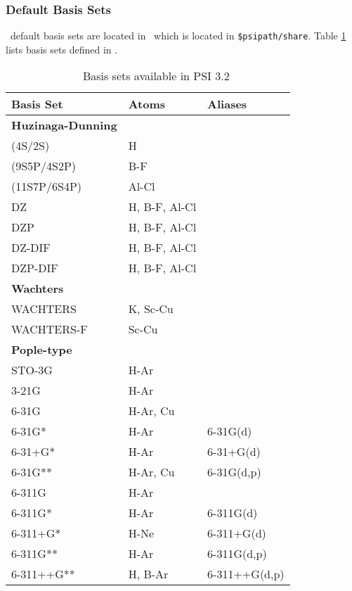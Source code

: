 \subsubsection{Default Basis Sets}
\PSIthree\ default basis sets are located in \pbasisdat\ which is located in
{\tt \$psipath/share}. Table \ref{table:basisset} lists basis sets
defined in \pbasisdat.

\begin{table}[tbp]
\caption{~~~Basis sets available in PSI 3.2}
\label{table:basisset}
\begin{center}
\begin{tabular}{|l|l|l|}
\hline
Basis Set 		&Atoms   	&Aliases\\ 
\hline
\hline
\textbf{Huzinaga-Dunning}		&				&\\
\hline
	(4S/2S)			& H				&\\
	(9S5P/4S2P)		& B-F				&\\
	(11S7P/6S4P)		& Al-Cl			&\\
	DZ			& H, B-F, Al-Cl		&\\
	DZP			& H, B-F, Al-Cl			&\\
	DZ-DIF			& H, B-F, Al-Cl		&\\
	DZP-DIF			& H, B-F, Al-Cl		&\\
\hline
\hline
\textbf{Wachters}			&				&\\
\hline
	WACHTERS		& K, Sc-Cu			&\\
	WACHTERS-F		& Sc-Cu			&\\
\hline
\hline
\textbf{Pople-type}		&				&\\
\hline
	STO-3G			& H-Ar			&\\
	3-21G			& H-Ar			&\\
	6-31G			& H-Ar, Cu			&\\
        6-31G*                  & H-Ar                  &6-31G(d)\\
        6-31+G*                 & H-Ar                  &6-31+G(d)\\
        6-31G**                 & H-Ar, Cu              &6-31G(d,p)\\
	6-311G			& H-Ar			&\\
	6-311G*                 & H-Ar                  &6-311G(d)\\
        6-311+G*                & H-Ne                  &6-311+G(d)\\
	6-311G**                & H-Ar                  &6-311G(d,p)\\
	6-311++G**		& H, B-Ar		&6-311++G(d,p)\\

\end{tabular}
\end{center}
\end{table}
